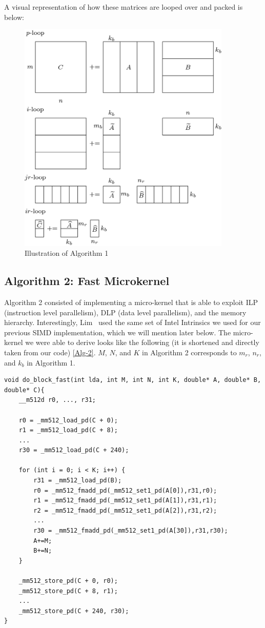 \documentclass{article}
\begin{document}
A visual representation of how these matrices are looped over and packed is below:

\begin{figure}
  \centerline{\includegraphics[width=4in]{figures/Illustration-of-Algorithm-1.png}}
  \caption{Illustration of Algorithm 1 ~\cite{10.1007/s10586-018-2810-y}}
\end{figure}

\newpage

\subsection{Algorithm 2: Fast Microkernel}
Algorithm 2 consisted of implementing a micro-kernel that is able to exploit ILP (instruction level parallelism), DLP (data level parallelism), and the memory hierarchy. Interestingly, Lim~\cite{10.1007/s10586-018-2810-y} used the same set of Intel Intrinsics we used for our previous SIMD implementation, which we will mention later below. The micro-kernel we were able to derive looks like the following (it is shortened and directly taken from our code) \ref{Alg-2}. $M$, $N$, and $K$ in Algorithm 2 corresponds to $m_r$, $n_r$, and $k_b$ in Algorithm 1.

\label{Alg-2}
\begin{verbatim}
void do_block_fast(int lda, int M, int N, int K, double* A, double* B, double* C){
    __m512d r0, ..., r31;
    
    r0 = _mm512_load_pd(C + 0);
    r1 = _mm512_load_pd(C + 8);
    ...
    r30 = _mm512_load_pd(C + 240);

    for (int i = 0; i < K; i++) {
        r31 = _mm512_load_pd(B);
        r0 = _mm512_fmadd_pd(_mm512_set1_pd(A[0]),r31,r0);
        r1 = _mm512_fmadd_pd(_mm512_set1_pd(A[1]),r31,r1);
        r2 = _mm512_fmadd_pd(_mm512_set1_pd(A[2]),r31,r2);
        ...
        r30 = _mm512_fmadd_pd(_mm512_set1_pd(A[30]),r31,r30);
        A+=M;
        B+=N;
    }

    _mm512_store_pd(C + 0, r0);
    _mm512_store_pd(C + 8, r1);
    ...
    _mm512_store_pd(C + 240, r30);
}
\end{verbatim}
\end{document}
